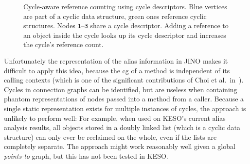 			\begin{figure}
				\centering%
				\caption[Cycle-aware reference counting using cycle descriptors]{%
					Cycle-aware reference counting using cycle descriptors. Blue {\color{cgblue}\blacksquare} vertices are part of
					a cyclic data structure, green {\color{cggreen}\blacksquare} ones reference cyclic structures. Nodes
					\texttt{1}–\texttt{3} share a cycle descriptor. Adding a reference to an object inside the cycle looks up its
					cycle descriptor and increases the cycle's reference count.}%
				\label{fig:ea:apps:cyclerefcnt}%
			\end{figure}

			Unfortunately the representation of the alias information in JINO makes it difficult to apply this idea, because
			the \gls{cg} of a method is independent of its calling contexts (which is one of the significant contributions of
			Choi et al.\ in~\cite{choi:03:toplas}). Cycles in connection graphs can be identified, but are useless when
			containing phantom representations of nodes passed into a method from a caller. Because a single static
			representation exists for multiple instances of cycles, the approach is unlikely to perform well: For example,
			when used on KESO's current alias analysis results, all objects stored in a doubly linked list (which is a cyclic
			data structure) can only ever be reclaimed on the whole, even if the lists are completely separate. The approach
			might work reasonably well given a global \emph{points-to} graph, but this has not been tested in KESO.
